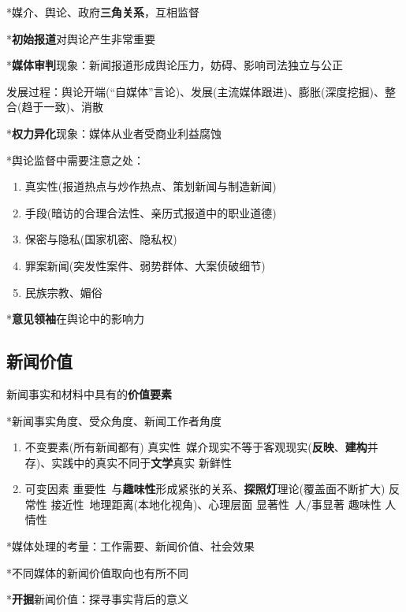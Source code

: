 \documentclass[a4paper,UTF8]{ctexart}
\begin{document}
*媒介、舆论、政府\textbf{三角关系}，互相监督

*\textbf{初始报道}对舆论产生非常重要

*\textbf{媒体审判}现象：新闻报道形成舆论压力，妨碍、影响司法独立与公正

发展过程：舆论开端(“自媒体”言论)、发展(主流媒体跟进)、膨胀(深度挖掘)、整合(趋于一致)、消散

*\textbf{权力异化}现象：媒体从业者受商业利益腐蚀

*舆论监督中需要注意之处：

\begin{enumerate}
	\item 真实性(报道热点与炒作热点、策划新闻与制造新闻)
	\item 手段(暗访的合理合法性、亲历式报道中的职业道德)
	\item 保密与隐私(国家机密、隐私权)
	\item 罪案新闻(突发性案件、弱势群体、大案侦破细节)
	\item 民族宗教、媚俗
\end{enumerate}

*\textbf{意见领袖}在舆论中的影响力

\subsection{新闻价值}
新闻事实和材料中具有的\textbf{价值要素}

*新闻事实角度、受众角度、新闻工作者角度

\begin{enumerate}
	\item 不变要素(所有新闻都有)
	\subitem 真实性\ 媒介现实不等于客观现实(\textbf{反映}、\textbf{建构}并存)、实践中的真实不同于\textbf{文学}真实
	\subitem 新鲜性
	\item 可变因素
	\subitem 重要性\ 与\textbf{趣味性}形成紧张的关系、\textbf{探照灯}理论(覆盖面不断扩大)
	\subitem 反常性
	\subitem 接近性\ 地理距离(本地化视角)、心理层面
	\subitem 显著性\ 人/事显著
	\subitem 趣味性
	\subitem 人情性
\end{enumerate}

*媒体处理的考量：工作需要、新闻价值、社会效果

*不同媒体的新闻价值取向也有所不同

*\textbf{开掘}新闻价值：探寻事实背后的意义
\end{document}
